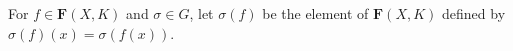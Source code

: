 For $f \in \mathbf{F}(X, K)$ and $\sigma \in G$, let $\sigma(f)$ be the element of $\mathbf{F}(X, K)$ defined by $\sigma(f)(x) = \sigma(f(x))$.
